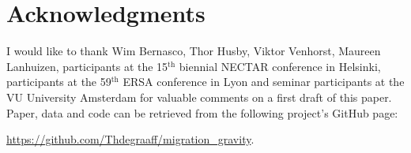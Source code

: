 \documentclass[fleqn,10pt]{SelfArx} %
\begin{document}
\section*{Acknowledgments}

I would like to thank Wim Bernasco, Thor Husby, Viktor Venhorst, Maureen
Lanhuizen, participants at the 15$^{\text{th}}$ biennial NECTAR conference in
Helsinki, participants at the 59$^{\text{th}}$ ERSA conference in Lyon and
seminar participants at the VU University Amsterdam for valuable comments on a
first draft of this paper. Paper, data and code can be retrieved from the
following project's GitHub page:

\href{https://github.com/Thdegraaff/migration_gravity}{https://github.com/Thdegraaff/migration\_gravity}.


\printbibliography

\end{document}
